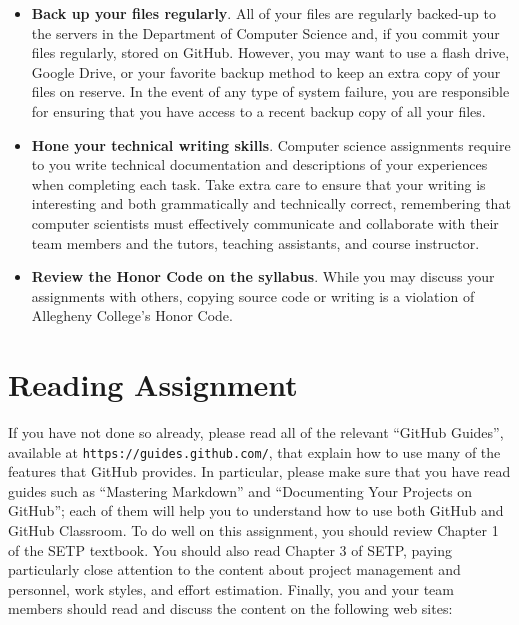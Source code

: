 \documentclass[11pt]{article}
\newcommand{\url}[1]{\lstinline{#1}}
\begin{document}
\begin{itemize}
\item {\bf Back up your files regularly}. All of your files are regularly backed-up to the servers in the Department of
  Computer Science and, if you commit your files regularly, stored on GitHub. However, you may want to use a flash
  drive, Google Drive, or your favorite backup method to keep an extra copy of your files on reserve. In the event of
  any type of system failure, you are responsible for ensuring that you have access to a recent backup copy of all your
  files.

\item {\bf Hone your technical writing skills}. Computer science assignments require to you write technical
  documentation and descriptions of your experiences when completing each task. Take extra care to ensure that your
  writing is interesting and both grammatically and technically correct, remembering that computer scientists must
  effectively communicate and collaborate with their team members and the tutors, teaching assistants, and course
  instructor.

\item {\bf Review the Honor Code on the syllabus}. While you may discuss your assignments with others, copying source
  code or writing is a violation of Allegheny College's Honor Code.

\end{itemize}

\section*{Reading Assignment}

If you have not done so already, please read all of the relevant ``GitHub Guides'', available at
\url{https://guides.github.com/}, that explain how to use many of the features that GitHub provides. In particular,
please make sure that you have read guides such as ``Mastering Markdown'' and ``Documenting Your Projects on GitHub'';
each of them will help you to understand how to use both GitHub and GitHub Classroom. To do well on this assignment, you
should review Chapter 1 of the SETP textbook. You should also read Chapter 3 of SETP, paying particularly close
attention to the content about project management and personnel, work styles, and effort estimation. Finally, you and
your team members should read and discuss the content on the following web sites:

\vspace*{-.5em}
\end{document}
